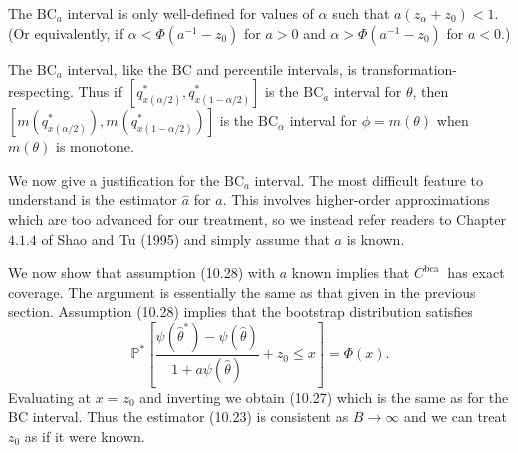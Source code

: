 \documentclass[10pt]{article}
\begin{document}
The $\mathrm{BC}_{a}$ interval is only well-defined for values of $\alpha$ such that $a\left(z_{\alpha}+z_{0}\right)<1$. (Or equivalently, if $\alpha<\Phi\left(a^{-1}-z_{0}\right)$ for $a>0$ and $\alpha>\Phi\left(a^{-1}-z_{0}\right)$ for $a<0$.)

The $\mathrm{BC}_{a}$ interval, like the $\mathrm{BC}$ and percentile intervals, is transformation-respecting. Thus if $\left[q_{x(\alpha / 2)}^{*}, q_{x(1-\alpha / 2)}^{*}\right]$ is the $\mathrm{BC}_{a}$ interval for $\theta$, then $\left[m\left(q_{x(\alpha / 2)}^{*}\right), m\left(q_{x(1-\alpha / 2)}^{*}\right)\right]$ is the $\mathrm{BC}_{\alpha}$ interval for $\phi=m(\theta)$ when $m(\theta)$ is monotone.

We now give a justification for the $\mathrm{BC}_{a}$ interval. The most difficult feature to understand is the estimator $\widehat{a}$ for $a$. This involves higher-order approximations which are too advanced for our treatment, so we instead refer readers to Chapter $4.1 .4$ of Shao and Tu (1995) and simply assume that $a$ is known.

We now show that assumption (10.28) with $a$ known implies that $C^{\text {bca }}$ has exact coverage. The argument is essentially the same as that given in the previous section. Assumption (10.28) implies that the bootstrap distribution satisfies
$$
\mathbb{P}^{*}\left[\frac{\psi\left(\widehat{\theta}^{*}\right)-\psi(\widehat{\theta})}{1+a \psi(\widehat{\theta})}+z_{0} \leq x\right]=\Phi(x) .
$$
Evaluating at $x=z_{0}$ and inverting we obtain (10.27) which is the same as for the BC interval. Thus the estimator (10.23) is consistent as $B \rightarrow \infty$ and we can treat $z_{0}$ as if it were known.
\end{document}
